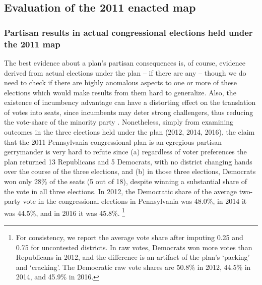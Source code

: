     \subsection*{Evaluation of the 2011 enacted map}
%
        \subsubsection*{Partisan results in actual congressional elections held under the 2011 map}
%
    The best evidence about a plan’s partisan consequences is, of course, evidence derived from actual elections under the plan -- if there are any -- though we do need to check if there are highly anomalous aspects to one or more of these elections which would make results from them hard to generalize. Also, the existence of incumbency advantage can have a distorting effect on the translation of votes into seats, since incumbents may deter strong challengers, thus reducing the vote-share of the minority party \citep{Jacobson_Kernell_1981, Abramowitz1991}. Nonetheless, simply from examining outcomes in the three elections held under the plan (2012, 2014, 2016), the claim that the 2011 Pennsylvania congressional plan is an egregious partisan gerrymander is very hard to refute since (a) regardless of voter preferences the plan returned 13 Republicans and 5 Democrats, with no district changing hands over the course of the three elections, and (b) in those three elections, Democrats won only 28\% of the seats (5 out of 18), despite winning a substantial share of the vote in all three elections. In 2012, the Democratic share of the average two-party vote in the congressional elections in Pennsylvania was 48.0\%, in 2014 it was 44.5\%, and in 2016 it was 45.8\%. 
        \footnote{For consistency, we report the average vote share after imputing 0.25 and 0.75 for uncontested districts. In raw votes, Democrats won more votes than Republicans in 2012, and the difference is an artifact of the plan's `packing' and `cracking'. The Democratic raw vote shares are 50.8\% in 2012, 44.5\% in 2014, and 45.9\% in 2016.}
